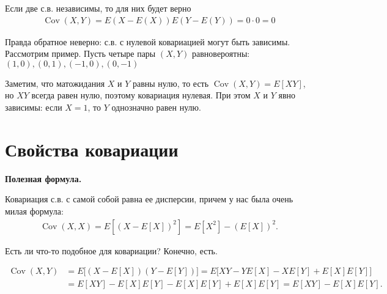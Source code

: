 \documentclass[12pt]{article}
\DeclareMathOperator{\Cov}{Cov}
\begin{document}
Если две с.в. независимы, то для них будет верно
\begin{align*}
  \Cov(X, Y) = E(X - E(X)) E(Y - E(Y)) = 0
  \cdot 0 = 0
\end{align*} 

Правда обратное неверно: с.в. с нулевой ковариацией могут быть зависимы. Рассмотрим пример. Пусть четыре пары $(X, Y)$ равновероятны: $(1, 0), (0, 1), (-1, 0), (0, -1)$

\begin{center}
\end{center}

Заметим, что матожидания $X$ и $Y$ равны нулю, то есть $\Cov(X, Y) = E[XY]$, но $XY$ всегда равен нулю, поэтому ковариация нулевая. При этом $X$ и $Y$ явно зависимы: если $X = 1$, то $Y$ однозначно равен нулю.

\section{Свойства ковариации}

\textbf{Полезная формула.}

Ковариация с.в. с самой собой равна ее дисперсии, причем у нас была очень милая формула:
\begin{align*}
  \Cov(X, X) = E[(X -E[X])^2] = E[X^2] - (E[X])^2.
\end{align*}

Есть ли что-то подобное для ковариации? Конечно, есть.

\begin{align*}
  \Cov(X, Y) &= E\bigg[(X - E[X])(Y - E[Y])\bigg] = E\bigg[XY - YE[X] - XE[Y] + E[X]E[Y]\bigg] \\
  &= E[XY] - E[X]E[Y] - E[X]E[Y] + E[X]E[Y] = E[XY] - E[X]E[Y].
\end{align*}

\begin{center}
\end{center}
\end{document}
